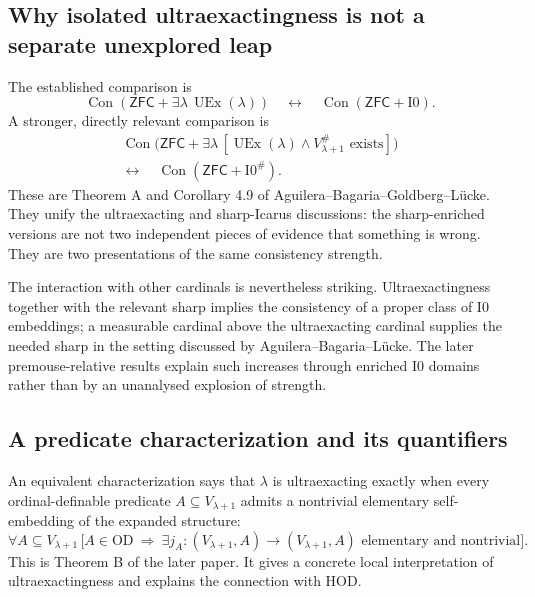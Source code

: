 \documentclass[11pt,letterpaper]{article}
\theoremstyle{definition}
\newcommand{\ZFC}{\mathsf{ZFC}}
\newcommand{\OD}{\mathrm{OD}}
\newcommand{\UEx}{\operatorname{UEx}}
\newcommand{\Con}{\operatorname{Con}}
\newcommand{\Izero}{\mathrm{I0}}
\newcommand{\Isharp}{\mathrm{I0}^{\#}}
\begin{document}
\subsection{Why isolated ultraexactingness is not a separate unexplored leap}

The established comparison is
\begin{equation}
 \Con(\ZFC+\exists\lambda\,\UEx(\lambda))
 \quad\longleftrightarrow\quad
 \Con(\ZFC+\Izero).
 \label{eq:ueqi0}
\end{equation}
A stronger, directly relevant comparison is
\begin{equation}
 \begin{split}
 \Con\bigl(\ZFC+\exists\lambda\,[\UEx(\lambda)
            \wedge V_{\lambda+1}^{\#}\text{ exists}]\bigr)\\
 \longleftrightarrow\quad \Con(\ZFC+\Isharp).
 \end{split}
 \label{eq:ueqsharp}
\end{equation}
These are Theorem A and Corollary 4.9 of Aguilera--Bagaria--Goldberg--L\"ucke. They unify the ultraexacting and sharp-Icarus discussions: the sharp-enriched versions are not two independent pieces of evidence that something is wrong. They are two presentations of the same consistency strength. \cite{abgl}

The interaction with other cardinals is nevertheless striking. Ultraexactingness together with the relevant sharp implies the consistency of a proper class of $\Izero$ embeddings; a measurable cardinal above the ultraexacting cardinal supplies the needed sharp in the setting discussed by Aguilera--Bagaria--L\"ucke. The later premouse-relative results explain such increases through enriched $\Izero$ domains rather than by an unanalysed explosion of strength. \cite[Theorem~D]{abl}\cite[Theorem~C]{abgl}

\subsection{A predicate characterization and its quantifiers}

An equivalent characterization says that $\lambda$ is ultraexacting exactly when every ordinal-definable predicate $A\subseteq V_{\lambda+1}$ admits a nontrivial elementary self-embedding of the expanded structure:
\begin{equation}
 \forall A\subseteq V_{\lambda+1}\,
 \bigl[A\in\OD\ \Longrightarrow\
   \exists j_A:(V_{\lambda+1},A)\to(V_{\lambda+1},A)
   \text{ elementary and nontrivial}\bigr].
 \label{eq:odpred}
\end{equation}
This is Theorem B of the later paper. It gives a concrete local interpretation of ultraexactingness and explains the connection with HOD. \cite{abgl}
\end{document}
